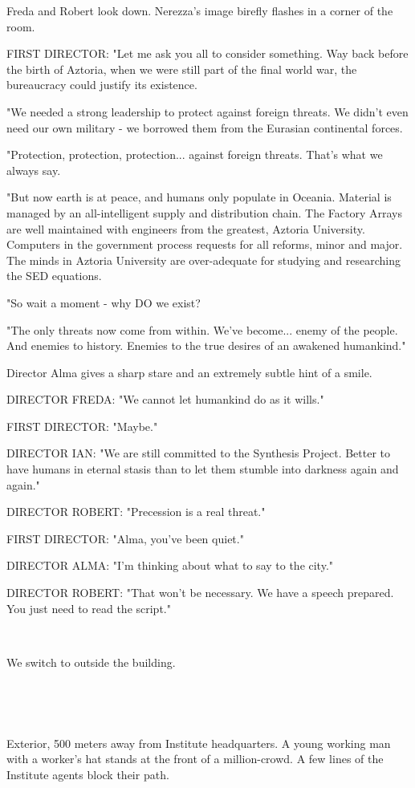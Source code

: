 \documentclass[11pt]{article}
\begin{document}
Freda and Robert look down. 
Nerezza's image birefly flashes in a corner of the room.

FIRST DIRECTOR: "Let me ask you all to consider something. 
Way back before the birth of Aztoria, when we were still part of the final world war, the bureaucracy could justify its existence.

"We needed a strong leadership to protect against foreign threats.
We didn't even need our own military - we borrowed them from the Eurasian continental forces.

"Protection, protection, protection... against foreign threats. That's what we always say.

"But now earth is at peace, and humans only populate in Oceania.
Material is managed by an all-intelligent supply and distribution chain.
The Factory Arrays are well maintained with engineers from the greatest, Aztoria University.
Computers in the government process requests for all reforms, minor and major. 
The minds in Aztoria University are over-adequate for studying and researching the SED equations.

"So wait a moment - why DO we exist? 

"The only threats now come from within.
We've become... enemy of the people.
And enemies to history.
Enemies to the true desires of an awakened humankind."

Director Alma gives a sharp stare and an extremely subtle hint of a smile.

DIRECTOR FREDA: "We cannot let humankind do as it wills."

FIRST DIRECTOR: "Maybe."

DIRECTOR IAN: "We are still committed to the Synthesis Project.
Better to have humans in eternal stasis than to let them stumble into darkness again and again."

DIRECTOR ROBERT: "Precession is a real threat."

FIRST DIRECTOR: "Alma, you've been quiet."

DIRECTOR ALMA: "I'm thinking about what to say to the city."

DIRECTOR ROBERT: "That won't be necessary. 
We have a speech prepared. 
You just need to read the script."

\ 

We switch to outside the building.

\ 

\ 

Exterior, 500 meters away from Institute headquarters.
A young working man with a worker's hat stands at the front of a million-crowd.
A few lines of the Institute agents block their path.
\end{document}
